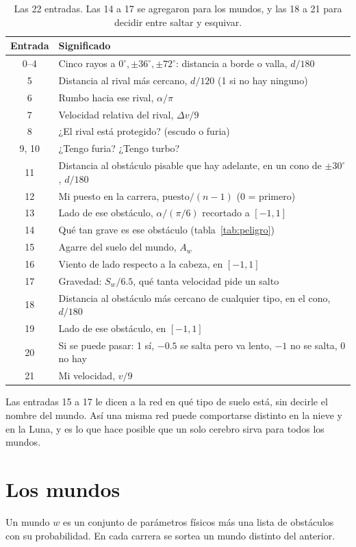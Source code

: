\documentclass[11pt,letterpaper]{article}
\begin{document}
\begin{table}[h]
\centering
\begin{tabular}{cl}
\toprule
Entrada & Significado \\
\midrule
0--4 & Cinco rayos a $0^\circ, \pm 36^\circ, \pm 72^\circ$: distancia a borde o valla, $d/180$ \\
5 & Distancia al rival más cercano, $d/120$ (1 si no hay ninguno) \\
6 & Rumbo hacia ese rival, $\alpha/\pi$ \\
7 & Velocidad relativa del rival, $\Delta v/9$ \\
8 & ¿El rival está protegido? (escudo o furia) \\
9, 10 & ¿Tengo furia? ¿Tengo turbo? \\
11 & Distancia al obstáculo pisable que hay adelante, en un cono de $\pm 30^\circ$, $d/180$ \\
12 & Mi puesto en la carrera, $\text{puesto}/(n-1)$ (0 = primero) \\
13 & Lado de ese obstáculo, $\alpha/(\pi/6)$ recortado a $[-1,1]$ \\
14 & Qué tan grave es ese obstáculo (tabla~\ref{tab:peligro}) \\
15 & Agarre del suelo del mundo, $A_w$ \\
16 & Viento de lado respecto a la cabeza, en $[-1,1]$ \\
17 & Gravedad: $S_w/6.5$, qué tanta velocidad pide un salto \\
18 & Distancia al obstáculo más cercano de cualquier tipo, en el cono, $d/180$ \\
19 & Lado de ese obstáculo, en $[-1,1]$ \\
20 & Si se puede pasar: 1 sí, $-0.5$ se salta pero va lento, $-1$ no se salta, 0 no hay \\
21 & Mi velocidad, $v/9$ \\
\bottomrule
\end{tabular}
\caption{Las 22 entradas. Las 14 a 17 se agregaron para los mundos, y las 18 a 21 para decidir entre saltar y esquivar.}
\end{table}

Las entradas 15 a 17 le dicen a la red en qué tipo de suelo está, sin decirle el nombre del mundo. Así una misma red puede comportarse distinto en la nieve y en la Luna, y es lo que hace posible que un solo cerebro sirva para todos los mundos.

\section{Los mundos}
Un mundo $w$ es un conjunto de parámetros físicos más una lista de obstáculos con su probabilidad. En cada carrera se sortea un mundo distinto del anterior.
\end{document}
